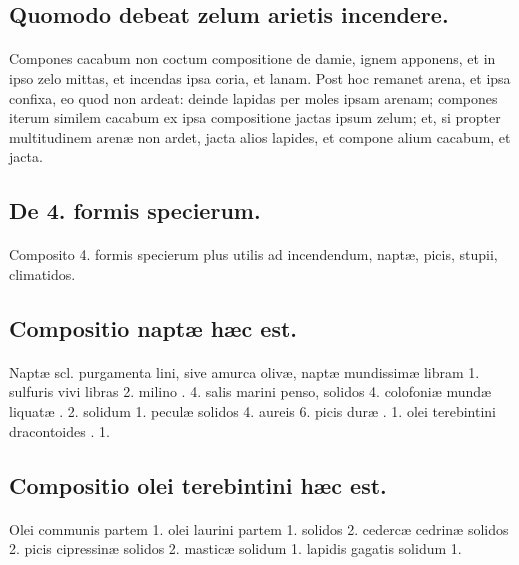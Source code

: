 \documentclass[a4paper, 11pt, oneside, polutonikogreek, italian]{article}
\begin{document}
\subsection{Quomodo debeat zelum arietis incendere.}
\paragraph{}
Compones cacabum non coctum compositione de damie, ignem apponens, et in ipso zelo mittas, et incendas ipsa coria, et lanam. Post hoc remanet arena, et ipsa confixa, eo quod non ardeat: deinde lapidas per moles ipsam arenam; compones iterum similem cacabum ex ipsa compositione jactas ipsum zelum; et, si propter multitudinem arenæ non ardet, jacta alios lapides, et compone alium cacabum, et jacta.

\subsection{De 4. formis specierum.}
\paragraph{}
Composito 4. formis specierum plus utilis ad incendendum, naptæ, picis, stupii, climatidos.

\subsection{Compositio naptæ hæc est.}
\paragraph{}
Naptæ scl. purgamenta lini, sive amurca olivæ, naptæ mundissimæ libram 1. sulfuris vivi libras 2. milino \roundz. 4. salis marini penso, solidos 4. colofoniæ mundæ liquatæ \roundz. 2. solidum 1. peculæ solidos 4. aureis 6. picis duræ \roundz. 1. olei terebintini dracontoides \roundz. 1.

\subsection{Compositio olei terebintini hæc est.}
\paragraph{}
Olei communis partem 1. olei laurini partem 1. solidos 2. cedercæ cedrinæ solidos 2. picis cipressinæ solidos 2. masticæ solidum 1. lapidis gagatis solidum 1.
\end{document}
